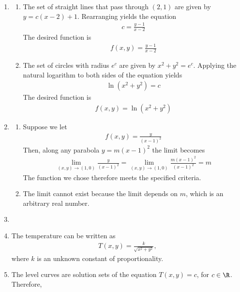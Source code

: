 \begin{enumerate}
\begin{enumerate}
\end{enumerate}
\item
\begin{enumerate}
\item The set of straight lines that pass through $(2,1)$ are given by $y = c(x-2) + 1$. Rearranging yields the equation 
\begin{align*}
c = \frac{y-1}{x-2}
\end{align*}
The desired function is 
\begin{align*}
f(x,y) = \frac{y-1}{x-2}
\end{align*}
\item The set of circles with radius $e^c$ are given by $x^2 + y^2 = e^c$. Applying the natural logarithm to both sides of the equation yields 
\begin{align*}
\ln(x^2+y^2) = c
\end{align*}
The desired function is 
\begin{align*}
f(x,y) =\ln(x^2+y^2)
\end{align*}\end{enumerate}
\item 
\begin{enumerate}
\item
Suppose we let 
\begin{align*}
f(x,y) = \frac{y}{(x-1)^2}
\end{align*}
Then, along any parabola $y = m(x-1)^2$ the limit becomes
\begin{align*}
\lim_{(x,y)\rightarrow(1,0) } \frac{y}{(x-1)^2} = \lim_{(x,y)\rightarrow(1,0) } \frac{m(x-1)^2}{(x-1)^2} = m
\end{align*}
The function we chose therefore meets the specified criteria.
\item
The limit cannot exist because the limit depends on $m$, which is an arbitrary real number.
\end{enumerate}
\item 
\BEN
\item The temperature can be written as 
\begin{align*}T(x,y) = \frac{k}{\sqrt{x^2 + y^2}},\end{align*} 
where $k$ is an unknown constant of proportionality.
\item The level curves are solution sets of the equation $T(x,y)=c$, for $c\in\R$. Therefore,

\end{enumerate}
